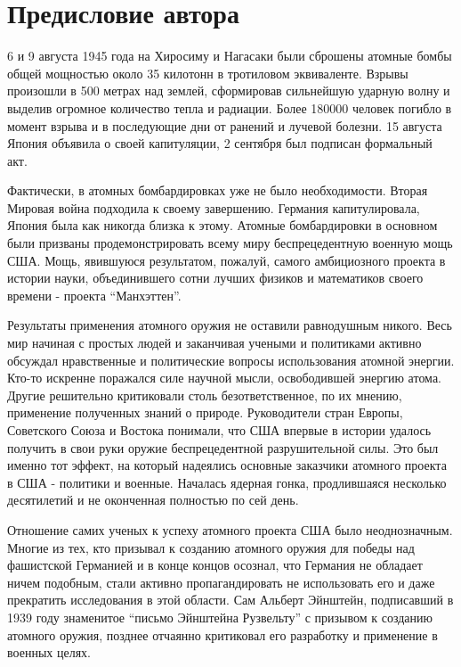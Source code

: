 \chapter*{Предисловие автора}

6 и 9 августа 1945 года на Хиросиму и Нагасаки были сброшены атомные бомбы общей мощностью около 35 килотонн в тротиловом эквиваленте.
Взрывы произошли в 500 метрах над землей, сформировав сильнейшую ударную волну и выделив огромное количество тепла и радиации.
Более 180000 человек погибло в момент взрыва и в последующие дни от ранений и лучевой болезни.
15 августа Япония объявила о своей капитуляции, 2 сентября был подписан формальный акт.

Фактически, в атомных бомбардировках уже не было необходимости. 
Вторая Мировая война подходила к своему завершению. 
Германия капитулировала, Япония была как никогда близка к этому.
Атомные бомбардировки в основном были призваны продемонстрировать всему миру беспрецедентную военную мощь США.
Мощь, явившуюся результатом, пожалуй, самого амбициозного проекта в истории науки, объединившего сотни лучших физиков и математиков своего времени - проекта ``Манхэттен''.

Результаты применения атомного оружия не оставили равнодушным никого.
Весь мир начиная с простых людей и заканчивая учеными и политиками активно обсуждал нравственные и политические вопросы использования атомной энергии.
Кто-то искренне поражался силе научной мысли, освободившей энергию атома.
Другие решительно критиковали столь безответственное, по их мнению, применение полученных знаний о природе.
Руководители стран Европы, Советского Союза и Востока понимали, что США впервые в истории удалось получить в свои руки оружие беспрецедентной разрушительной силы. 
Это был именно тот эффект, на который надеялись основные заказчики атомного проекта в США - политики и военные.  
Началась ядерная гонка, продлившаяся несколько десятилетий и не оконченная полностью по сей день.

Отношение самих ученых к успеху атомного проекта США было неоднозначным.
Многие из тех, кто призывал к созданию атомного оружия для победы над фашистской Германией и в конце концов осознал, что Германия не обладает ничем подобным, стали активно пропагандировать не использовать его и даже прекратить исследования в этой области. 
Сам Альберт Эйнштейн, подписавший в 1939 году знаменитое ``письмо Эйнштейна Рузвельту'' с призывом к созданию атомного оружия, позднее отчаянно критиковал его разработку и применение в военных целях.

